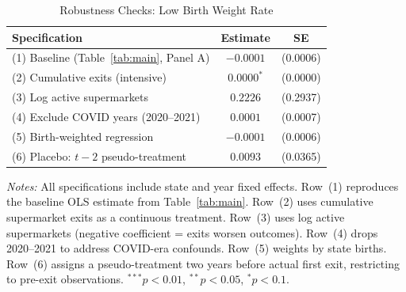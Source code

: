 \begin{table}[htbp]
\centering
\begin{threeparttable}
\caption{Robustness Checks: Low Birth Weight Rate}
\label{tab:robustness}
\begin{tabular}{lcc}
\hline\hline
Specification & Estimate & SE \\
\hline
(1) Baseline (Table~\ref{tab:main}, Panel A) & $-0.0001$ & (0.0006) \\
(2) Cumulative exits (intensive) & $0.0000^{*}$ & (0.0000) \\
(3) Log active supermarkets & $0.2226$ & (0.2937) \\
(4) Exclude COVID years (2020--2021) & $0.0001$ & (0.0007) \\
(5) Birth-weighted regression & $-0.0001$ & (0.0006) \\
(6) Placebo: $t-2$ pseudo-treatment & $0.0093$ & (0.0365) \\
\hline\hline
\end{tabular}
\begin{tablenotes}[flushleft]
\footnotesize
\item \textit{Notes:} All specifications include state and year fixed effects.
Row~(1) reproduces the baseline OLS estimate from Table~\ref{tab:main}.
Row~(2) uses cumulative supermarket exits as a continuous treatment.
Row~(3) uses log active supermarkets (negative coefficient = exits worsen outcomes).
Row~(4) drops 2020--2021 to address COVID-era confounds.
Row~(5) weights by state births. Row~(6) assigns a pseudo-treatment two years
before actual first exit, restricting to pre-exit observations.
$^{***}p<0.01$, $^{**}p<0.05$, $^{*}p<0.1$.
\end{tablenotes}
\end{threeparttable}
\end{table}
